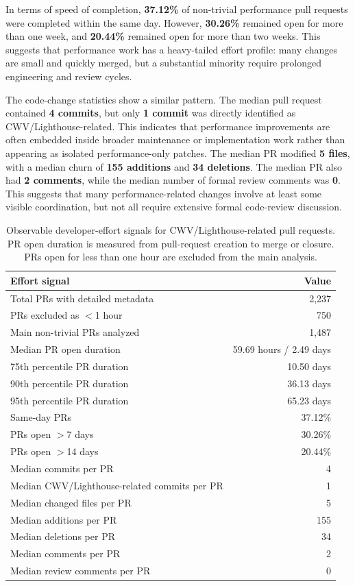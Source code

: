 In terms of speed of completion, \textbf{37.12\%} of non-trivial performance pull requests were completed within the same day. However, \textbf{30.26\%} remained open for more than one week, and \textbf{20.44\%} remained open for more than two weeks. This suggests that performance work has a heavy-tailed effort profile: many changes are small and quickly merged, but a substantial minority require prolonged engineering and review cycles.

The code-change statistics show a similar pattern. The median pull request contained \textbf{4 commits}, but only \textbf{1 commit} was directly identified as CWV/Lighthouse-related. This indicates that performance improvements are often embedded inside broader maintenance or implementation work rather than appearing as isolated performance-only patches. The median PR modified \textbf{5 files}, with a median churn of \textbf{155 additions} and \textbf{34 deletions}. The median PR also had \textbf{2 comments}, while the median number of formal review comments was \textbf{0}. This suggests that many performance-related changes involve at least some visible coordination, but not all require extensive formal code-review discussion.

\begin{table}[t]
\centering
\small
\begin{tabular}{lr}
\toprule
\textbf{Effort signal} & \textbf{Value} \\
\midrule
Total PRs with detailed metadata & 2,237 \\
PRs excluded as $<$1 hour & 750 \\
Main non-trivial PRs analyzed & 1,487 \\
Median PR open duration & 59.69 hours / 2.49 days \\
75th percentile PR duration & 10.50 days \\
90th percentile PR duration & 36.13 days \\
95th percentile PR duration & 65.23 days \\
Same-day PRs & 37.12\% \\
PRs open $>$7 days & 30.26\% \\
PRs open $>$14 days & 20.44\% \\
Median commits per PR & 4 \\
Median CWV/Lighthouse-related commits per PR & 1 \\
Median changed files per PR & 5 \\
Median additions per PR & 155 \\
Median deletions per PR & 34 \\
Median comments per PR & 2 \\
Median review comments per PR & 0 \\
\bottomrule
\end{tabular}
\caption{Observable developer-effort signals for CWV/Lighthouse-related pull requests. PR open duration is measured from pull-request creation to merge or closure. PRs open for less than one hour are excluded from the main analysis.}
\label{tab:developer-effort}
\end{table}


